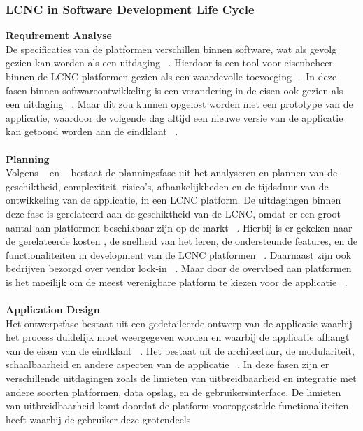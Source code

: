 \subsubsection*{LCNC in Software Development Life Cycle}
\label{subsec:lcnc-binnen-agile}
\textbf{Requirement Analyse}
\\
De specificaties van de platformen verschillen binnen software, wat als gevolg gezien kan worden als een uitdaging ~\autocite{Rokis_2022}. 
Hierdoor is een tool voor eisenbeheer binnen de LCNC platformen gezien als een waardevolle toevoeging ~\autocite{Rokis_2022}. 
In deze fasen binnen softwareontwikkeling is een verandering in de eisen ook gezien als een uitdaging ~\autocite{Rokis_2022}. 
Maar dit zou kunnen opgelost worden met een prototype van de applicatie, 
waardoor de volgende dag altijd een nieuwe versie van de applicatie kan getoond worden aan de eindklant ~\autocite{Rokis_2022}.
\\
\\
\textbf{Planning}
\\
Volgens ~\textcite{Rokis_2022} en ~\textcite{Ghumatkar_2023}  bestaat de planningsfase uit het analyseren en plannen van de geschiktheid, complexiteit, risico's, afhankelijkheden en 
de tijdsduur van de ontwikkeling van de applicatie, in een LCNC platform. De uitdagingen binnen deze fase is gerelateerd aan de geschiktheid van de LCNC, 
omdat er een groot aantal aan platformen beschikbaar zijn op de markt ~\autocite{Rokis_2022}. Hierbij is er gekeken naar de gerelateerde kosten , de 
snelheid van het leren, de ondersteunde features, en de functionaliteiten in development van de LCNC platformen ~\autocite{Rokis_2022}. 
Daarnaast zijn ook bedrijven bezorgd over vendor lock-in ~\autocite{Rokis_2022}. Maar door de overvloed aan platformen is het moeilijk om 
de meest verenigbare platform te kiezen voor de applicatie ~\autocite{Rokis_2022}.
\\
\\
\textbf{Application Design}
\\
Het ontwerpsfase bestaat uit een gedetaileerde ontwerp van de applicatie waarbij het process duidelijk moet weergegeven worden en waarbij de applicatie afhangt van de eisen van de eindklant ~\autocite{Ghumatkar_2023}. 
Het bestaat uit de architectuur, de modulariteit, schaalbaarheid en andere aspecten van de applicatie ~\autocite{Rokis_2022}. 
In deze fasen zijn er verschillende uitdagingen zoals de limieten van uitbreidbaarheid en integratie met andere soorten platformen, data opslag, en de gebruikersinterface. De limieten van uitbreidbaarheid komt doordat de platform vooropgestelde functionaliteiten heeft waarbij de gebruiker deze grotendeels 
